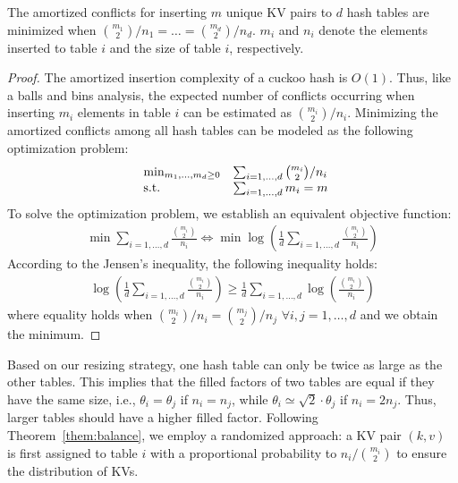 \begin{theorem}\label{them:balance}
	The amortized conflicts for inserting $m$ unique KV pairs to $d$ hash tables are minimized when $\binom{m_1}{2}/n_1 = \ldots = \binom{m_d}{2}/n_d$. 
	$m_i$ and $n_i$ denote the elements inserted to table $i$ and the size of table $i$, respectively.  
\end{theorem}
\begin{proof}
	The amortized insertion complexity of a cuckoo hash is $O(1)$. Thus, like a balls and bins analysis, the expected number of conflicts occurring when inserting $m_i$ elements in table $i$ can be estimated as $\binom{m_i}{2}/n_i$. Minimizing the amortized conflicts among all hash tables can be modeled as the following optimization problem:
	\begin{equation}\label{eq:conflict-min}
	\begin{array}{ll@{}ll}
	\min_{m_1,\ldots,m_d \geq 0} & \sum_{i=1,\ldots,d} \binom{m_i}{2}/n_i \\
	\text{s.t.} & \sum_{i=1,\ldots,d} m_i = m
	\end{array}
	\end{equation}
	To solve the optimization problem, we establish an equivalent objective function:
	\begin{align*}
	\min \sum_{i=1,\ldots,d} \frac{\binom{m_i}{2}}{n_i} \Leftrightarrow \min \log(\frac{1}{d}\sum_{i=1,\ldots,d} \frac{\binom{m_i}{2}}{n_i})
	\end{align*}
	According to the Jensen's inequality, the following inequality holds:
	\begin{align*}
	\log(\frac{1}{d}\sum_{i=1,\ldots,d} \frac{\binom{m_i}{2}}{n_i}) \geq \frac{1}{d}\sum_{i=1,\ldots,d}\log(\frac{\binom{m_i}{2}}{n_i})
	\end{align*}
	where equality holds when $\binom{m_i}{2}/n_i = \binom{m_j}{2}/n_j$ $\forall i,j = 1,\ldots,d$ and we obtain the minimum.
\end{proof}

Based on our resizing strategy, one hash table can only be twice as large as the other tables. 
This implies that the filled factors of two tables are equal if they have the same size, i.e., $\theta_i = \theta_j$ if $n_i = n_j$, 
while $\theta_i \simeq \sqrt{2}\cdot \theta_j$ if $n_i = 2n_j$. 
Thus, larger tables should have a higher filled factor. 
Following Theorem~\ref{them:balance},
we employ a randomized approach: 
a KV pair $(k,v)$ is first assigned to table $i$ with a proportional probability to $n_i/\binom{m_i}{2}$ to ensure the distribution of KVs.

